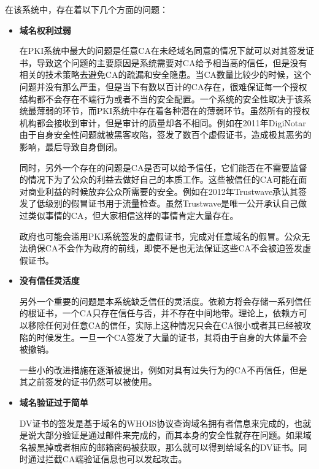 在该系统中，存在着以下几个方面的问题\cite{ristic2014bulletproof}：


\begin{itemize}
	\item

	\noindent\textbf{域名权利过弱}

	在PKI系统中最大的问题是任意CA在未经域名同意的情况下就可以对其签发证书，导致这个问题的主要原因是系统需要对CA给予相当高的信任，但是没有相关的技术策略去避免CA的疏漏和安全隐患。当CA数量比较少的时候，这个问题并没有那么严重，但是当下有数以百计的CA存在，很难保证每一个授权结构都不会存在不端行为或者不当的安全配置。一个系统的安全性取决于该系统最薄弱的环节，而PKI系统中存在着各种潜在的薄弱环节。虽然所有的授权机构都会接收到审计，但是审计的质量却各不相同。例如在2011年DigiNotar由于自身安全性问题就被黑客攻陷，签发了数百个虚假证书，造成极其恶劣的影响，最后导致自身倒闭。

	同时，另外一个存在的问题是CA是否可以给予信任，它们能否在不需要监督的情况下为了公众的利益去做好自己的本质工作。这些被信任的CA可能在面对商业利益的时候放弃公众所需要的安全。例如在2012年Trustwave承认其签发了低级别的假冒证书用于流量检查。虽然Trustwave是唯一公开承认自己做过类似事情的CA，但大家相信这样的事情肯定大量存在。

	政府也可能会滥用PKI系统签发的虚假证书，完成对任意域名的假冒。公众无法确保CA不会作为政府的前线，即使不是也无法保证这些CA不会被迫签发虚假证书。



	\item

	\noindent\textbf{没有信任灵活度}

	另外一个重要的问题是本系统缺乏信任的灵活度。依赖方将会存储一系列信任的根证书，一个CA只存在信任与否，并不存在中间地带。理论上，依赖方可以移除任何对任意CA的信任，实际上这种情况只会在CA很小或者其已经被攻陷的时候发生。一旦一个CA签发了大量的证书，其将由于自身的大体量不会被撤销。

	一些小的改进措施在逐渐被提出，例如对具有过失行为的CA不再信任，但是其之前签发的证书仍然可以被使用。

	\item

	\noindent\textbf{域名验证过于简单}

	DV证书的签发是基于域名的WHOIS协议查询域名拥有者信息来完成的，也就是说大部分验证是通过邮件来完成的，而其本身的安全性就存在问题。如果域名被黑掉或者相应的邮箱密码被获取，那么就可以得到给域名的DV证书。同时通过拦截CA端验证信息也可以发起攻击。




\end{itemize}
